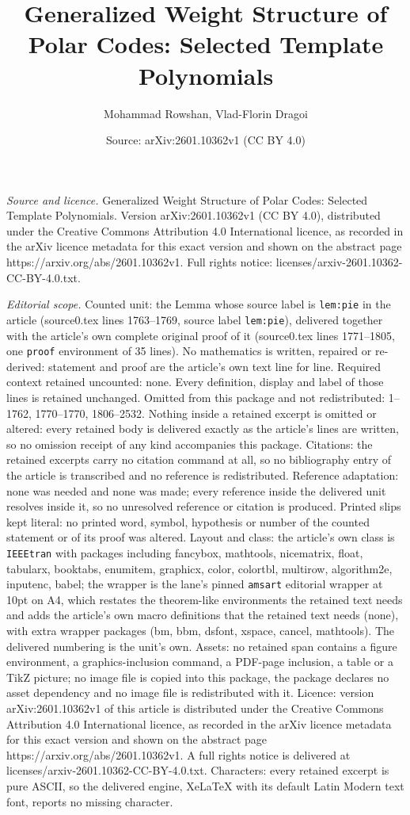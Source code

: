 \documentclass[10pt,a4paper]{amsart}
\title[Generalized Weight Structure of Polar Codes: Selected Templa]{Generalized Weight Structure of Polar Codes: Selected Template Polynomials}
\author{Mohammad Rowshan, Vlad-Florin Dragoi}
\date{Source: arXiv:2601.10362v1 (CC BY 4.0)}
\begin{document}
\maketitle

\noindent\emph{Source and licence.} Generalized Weight Structure of Polar Codes: Selected Template Polynomials. Version arXiv:2601.10362v1 (CC BY 4.0), distributed under the Creative Commons Attribution 4.0 International licence, as recorded in the arXiv licence metadata for this exact version and shown on the abstract page https://arxiv.org/abs/2601.10362v1. Full rights notice: licenses/arxiv-2601.10362-CC-BY-4.0.txt.\par\smallskip

\noindent\textit{Editorial scope.} Counted unit: the Lemma whose source label is \texttt{lem:pie} in the article (source0.tex lines 1763--1769, source label \texttt{lem:pie}), delivered together with the article's own complete original proof of it (source0.tex lines 1771--1805, one \texttt{proof} environment of 35 lines). No mathematics is written, repaired or re-derived: statement and proof are the article's own text line for line. Required context retained uncounted: none. Every definition, display and label of those lines is retained unchanged. Omitted from this package and not redistributed: 1--1762, 1770--1770, 1806--2532. Nothing inside a retained excerpt is omitted or altered: every retained body is delivered exactly as the article's lines are written, so no omission receipt of any kind accompanies this package. Citations: the retained excerpts carry no citation command at all, so no bibliography entry of the article is transcribed and no reference is redistributed. Reference adaptation: none was needed and none was made; every reference inside the delivered unit resolves inside it, so no unresolved reference or citation is produced. Printed slips kept literal: no printed word, symbol, hypothesis or number of the counted statement or of its proof was altered. Layout and class: the article's own class is \texttt{IEEEtran} with packages including fancybox, mathtools, nicematrix, float, tabularx, booktabs, enumitem, graphicx, color, colortbl, multirow, algorithm2e, inputenc, babel; the wrapper is the lane's pinned \texttt{amsart} editorial wrapper at 10pt on A4, which restates the theorem-like environments the retained text needs and adds the article's own macro definitions that the retained text needs (none), with extra wrapper packages (bm, bbm, dsfont, xspace, cancel, mathtools). The delivered numbering is the unit's own. Assets: no retained span contains a figure environment, a graphics-inclusion command, a PDF-page inclusion, a table or a TikZ picture; no image file is copied into this package, the package declares no asset dependency and no image file is redistributed with it. Licence: version arXiv:2601.10362v1 of this article is distributed under the Creative Commons Attribution 4.0 International licence, as recorded in the arXiv licence metadata for this exact version and shown on the abstract page https://arxiv.org/abs/2601.10362v1. A full rights notice is delivered at licenses/arxiv-2601.10362-CC-BY-4.0.txt. Characters: every retained excerpt is pure ASCII, so the delivered engine, XeLaTeX with its default Latin Modern text font, reports no missing character.
\end{document}
